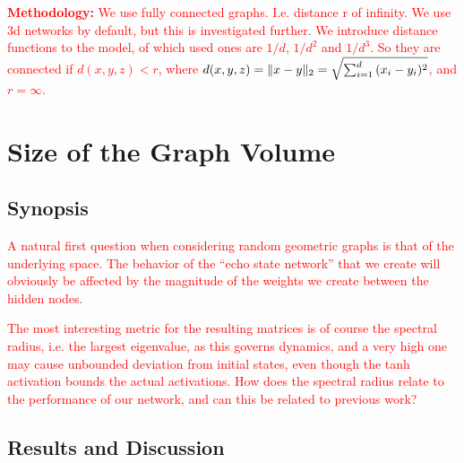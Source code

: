 \textcolor{red}{
  \textbf{Methodology:} We use fully connected graphs. I.e. distance r of
infinity. We use 3d networks by default, but this is investigated further. We
introduce distance functions to the model, of which used ones are $1/d$, $1/d^2$
and $1/d^3$. So they are connected if $d(x, y, z) < r$, where $d(x, y, z) =
\Vert x-y \Vert_{2} = \sqrt{\sum_{i=1}^{d}{(x_{i}-y_{i})^2}}$, and $r = \infty$.
}

\section{Size of the Graph Volume}

\subsection{Synopsis}

\textcolor{red}{
  A natural first question when considering random geometric graphs is that of
the underlying space. The behavior of the ``echo state network'' that we create
will obviously be affected by the magnitude of the weights we create between the
hidden nodes.
}

\textcolor{red}{
  The most interesting metric for the resulting matrices is of course the
spectral radius, i.e. the largest eigenvalue, as this governs dynamics, and a
very high one may cause unbounded deviation from initial states, even though the
tanh activation bounds the actual activations. How does the spectral radius
relate to the performance of our network, and can this be related to previous
work?
}

\subsection{Results and Discussion}

